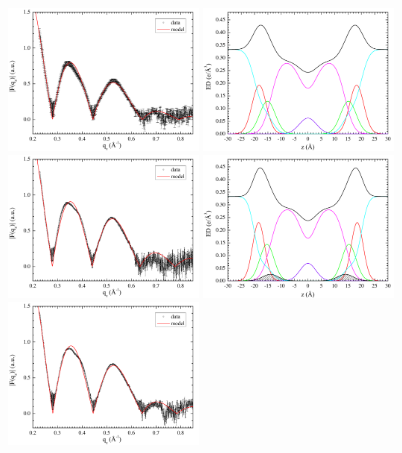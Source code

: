 \begin{figure}[htbp]
  \centering
  \includegraphics[width=0.45\textwidth,valign=t]{figures/Tat/SDP_Results/XFF/DOPCDOPE3to1_XFF1}
  \includegraphics[width=0.45\textwidth,valign=t]{./figures/Tat/SDP_Results/EDP/DOPCDOPE3to1_EDP1}
  \includegraphics[width=0.45\textwidth,valign=t]{figures/Tat/SDP_Results/XFF/DOPCDOPE3to1_Tat_62to1_3p0_XFF1}
  \includegraphics[width=0.45\textwidth,valign=t]{./figures/Tat/SDP_Results/EDP/DOPCDOPE3to1_Tat_62to1_3p0_EDP1}
  \includegraphics[width=0.45\textwidth,valign=t]{figures/Tat/SDP_Results/XFF/DOPCDOPE3to1_Tat_28to1_3p0_XFF1}

\end{figure}
